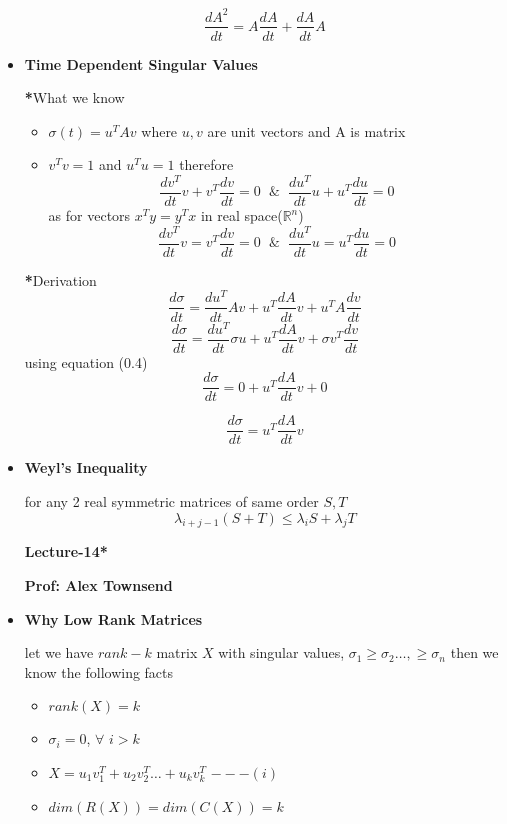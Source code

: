 \documentclass[a4paper]{article}
\numberwithin{equation}{section}
\begin{document}
\begin{itemize}
\[\boxed{\frac{dA^2}{dt}=A\frac{dA}{dt}+\frac{dA}{dt}A}\]

\item \textbf{Time Dependent Singular Values}

\textbf{*}What we know 
\begin{itemize}
    \item $\sigma(t)=u^TAv$ where $u,v$ are unit vectors and A is matrix
    \item $v^Tv=1$ and $u^Tu=1$ therefore 
    \[\frac{dv^T}{dt}v+v^T\frac{dv}{dt}=0 \hspace{7pt} \& \hspace{7pt}\frac{du^T}{dt}u+u^T\frac{du}{dt}=0\]
as for vectors $x^Ty=y^Tx$ in real space($\mathbb{R}^n$)
\begin{equation}
    \frac{dv^T}{dt}v=v^T\frac{dv}{dt}=0 \hspace{7pt} \& \hspace{7pt}\frac{du^T}{dt}u=u^T\frac{du}{dt}=0
\end{equation}
\end{itemize}
\textbf{*}Derivation
\[\frac{d\sigma}{dt}=\frac{du^T}{dt}Av+u^T\frac{dA}{dt}v+u^TA\frac{dv}{dt}\]
\[\frac{d\sigma}{dt}=\frac{du^T}{dt}\sigma u+u^T\frac{dA}{dt}v+\sigma v^T\frac{dv}{dt}\]
using equation (0.4)
\[\frac{d\sigma}{dt}=0+u^T\frac{dA}{dt}v+0\]

\[\boxed{\frac{d\sigma}{dt}=u^T\frac{dA}{dt}v}\]

\item \textbf{Weyl's Inequality} 

for any 2 real symmetric matrices of same order $S,T$
\[\boxed{\lambda_{i+j-1}(S+T)\leq \lambda_i{S}+\lambda_j{T}}\]

\begin{center}
    \textbf{\Huge Lecture-14*}
\end{center}
\begin{center}
    \textbf{Prof: Alex Townsend}
\end{center}

\item \textbf{Why Low Rank Matrices}

let we have $rank-k$ matrix $X$ with singular values, $\sigma_1\geq \sigma_2\dots,\geq \sigma_n$ then we know the following facts
\begin{itemize}
    \item $rank(X)=k$
    \item $\sigma_{i}=0$, $\forall$ $i>k$
    \item $X=u_1v_1^T+u_2v_2^T\dots+u_kv_k^T$ $---(i)$
    \item $dim(R(X))=dim(C(X))=k$
\end{itemize}


\end{itemize}
\end{document}
